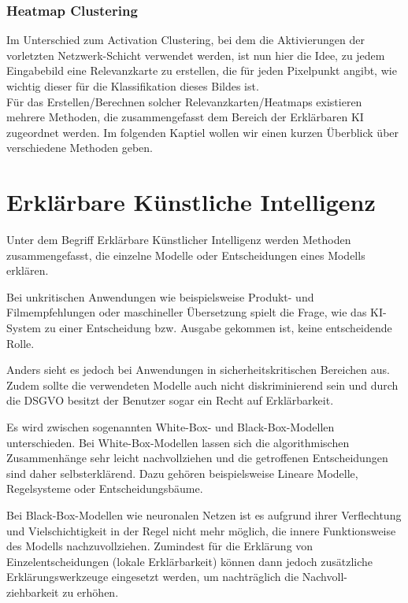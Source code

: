 \documentclass[11pt,a4paper]{article}
\numberwithin{equation}{section}
\begin{document}
	\subsubsection{Heatmap Clustering}
	Im Unterschied zum Activation Clustering, bei dem die Aktivierungen der vorletzten Netzwerk-Schicht verwendet werden, ist nun hier die Idee, zu jedem Eingabebild eine Relevanzkarte zu erstellen, die für jeden Pixelpunkt angibt, wie wichtig dieser für die Klassifikation dieses Bildes ist. \\
	
	Für das Erstellen/Berechnen solcher Relevanzkarten/Heatmaps existieren mehrere Methoden, die zusammengefasst dem Bereich der Erklärbaren KI zugeordnet werden.
	Im folgenden Kaptiel wollen wir einen kurzen Überblick über verschiedene Methoden geben.
	
	
	\section{Erklärbare Künstliche Intelligenz}
	\label{chapter_xai}
	
	Unter dem Begriff Erklärbare Künstlicher Intelligenz werden Methoden zusammengefasst, die einzelne Modelle oder Entscheidungen eines Modells erklären.
	
	Bei unkritischen Anwendungen wie beispielsweise Produkt- und Filmempfehlungen oder maschineller Übersetzung spielt die Frage, wie das KI-System zu einer Entscheidung bzw. Ausgabe gekommen ist, keine entscheidende Rolle.
	
	Anders sieht es jedoch bei Anwendungen in sicherheitskritischen Bereichen aus. Zudem sollte die verwendeten Modelle auch nicht diskriminierend sein und durch die DSGVO besitzt der Benutzer sogar ein Recht auf Erklärbarkeit.
	
	Es wird zwischen sogenannten White-Box- und Black-Box-Modellen unterschieden. Bei White-Box-Modellen lassen sich die algorithmischen Zusammenhänge sehr leicht nachvollziehen und die getroffenen Entscheidungen sind daher selbsterklärend.
	Dazu gehören beispielsweise Lineare Modelle, Regelsysteme oder Entscheidungsbäume.
	
	Bei Black-Box-Modellen wie neuronalen Netzen ist es aufgrund ihrer Verflechtung und Vielschichtigkeit in der Regel nicht mehr möglich, die innere Funktionsweise des Modells nachzuvollziehen. Zumindest für die Erklärung von Einzelentscheidungen (lokale Erklärbarkeit) können dann jedoch zusätzliche Erklärungswerkzeuge eingesetzt werden, um nachträglich die Nachvoll-
	ziehbarkeit zu erhöhen. 
	
\end{document}
